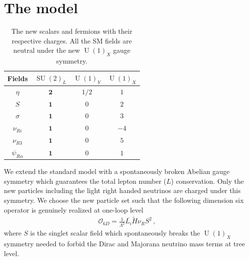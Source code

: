\documentclass[12pt]{article}
\begin{document}
\section{The model}
\label{sec:Model}
%
\begin{table}[t!]
  \centering
  \begin{tabular}{|c|c|c|c|}
    \hline  
    Fields     & $\operatorname{SU}(2)_L$ & $\operatorname{U}(1)_Y $ & $\operatorname{U}(1)_X$ \\ \hline
    $\eta$  & $\boldsymbol{2}$ & $1/2$  & $1$ \\
    $S$ & $\boldsymbol{1}$ & $0$  & $2$ \\
    $\sigma$ & $\boldsymbol{1}$ & $0$ & $3$ \\
    \hline
    $\nu_{Ri}$ & $\boldsymbol{1}$ & $0$ & $-4$\\
    $\nu_{R3}$ & $\boldsymbol{1}$ & $0$ & $5$\\
    $\psi_{R\alpha}$  & $\boldsymbol{1}$ & 0 & $1$ \\\hline
  \end{tabular}
  \caption{The new scalars and fermions with their respective charges. All the SM fields are neutral under the new $\operatorname{U}(1)_X$ gauge symmetry. }
    \label{tab:partcont}
\end{table}
%
We extend the standard model with a spontaneously broken Abelian gauge symmetry  which guarantees the total lepton number ($L$) conservation. Only the new particles including the light right handed neutrinos are charged under this symmetry. We choose the new particle set such that the following dimension six operator is genuinely realized at one-loop level
\begin{align}
  \label{eq:ld6}
  \mathcal{O}_{6D}=\frac{1}{\Lambda^2} \overline{L_i} \tilde{H} \nu_R S^2\,,
\end{align}
where $S$ is the singlet scalar field which spontaneously breaks the $\operatorname{U}(1)_X$ symmetry needed to forbid the Dirac and Majorana neutrino mass terms at tree level.
\end{document}
